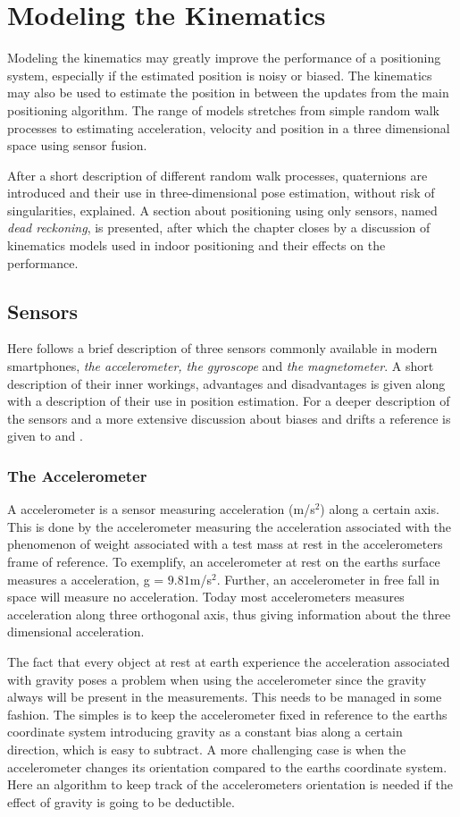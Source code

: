 \documentclass{LTHthesis}
\begin{document}
\chapter{Modeling the Kinematics} %
\label{chap:kin}
%
Modeling the kinematics may greatly improve the performance of a positioning system, especially if the estimated position is noisy or biased. The kinematics may also be used to estimate the position in between the updates from the main positioning algorithm. The range of models stretches from simple random walk processes to estimating acceleration, velocity and position in a three dimensional space using sensor fusion.

After a short description of different random walk processes, quaternions are introduced and their use in three-dimensional pose  estimation, without risk of singularities, explained. A section about positioning using only sensors, named \emph{dead reckoning}, is presented, after which the chapter closes by a discussion of kinematics models used in indoor positioning and their effects on the performance.   
%
\section{Sensors}
Here follows a brief description of three sensors commonly available in modern smartphones, \emph{the accelerometer, the gyroscope} and \emph{the magnetometer}. A short description of their inner workings, advantages and disadvantages is given along with a description of their use in position estimation. For a deeper description of the sensors and a more extensive discussion about biases and drifts a reference is given to \cite{bently88} and \cite{morris96}. 
%
\subsection{The Accelerometer}
%
A accelerometer is a sensor measuring acceleration (m/s$^2$) along a certain axis. This is done by the accelerometer measuring the acceleration associated with the phenomenon of weight associated with a test mass at rest in the accelerometers frame of reference. To exemplify, an accelerometer at rest on the earths surface measures a acceleration, g = $9.81$m/s$^2$. Further, an accelerometer in free fall in space will measure no acceleration. Today most accelerometers measures acceleration along three orthogonal axis, thus giving information about the three dimensional acceleration. 

The fact that every object at rest at earth experience the acceleration associated with gravity poses a problem when using the accelerometer since the gravity always will be present in the measurements. This needs to be managed in some fashion. The simples is to keep the accelerometer fixed in reference to the earths coordinate system introducing gravity as a constant bias along a certain direction, which is easy to subtract. A more challenging case is when the accelerometer changes its orientation compared to the earths coordinate system. Here an algorithm to keep track of the accelerometers orientation is needed if the effect of gravity is going to be deductible. 
\end{document}
